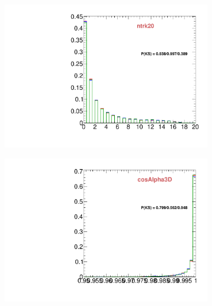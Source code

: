 \begin{figure}
        \centering
        \begin{subfigure}[b]{0.2\textwidth}
                \centering
                \includegraphics[width=\textwidth]{Figures/VariablesComparison/MC_barrel_figs_3h/ntrk20}
                \label{fig:MC_barrel_ntrk20_3h}
        \end{subfigure}
        \begin{subfigure}[b]{0.2\textwidth}
                \centering
                \includegraphics[width=\textwidth]{Figures/VariablesComparison/MC_barrel_figs_3h/cosAlpha3D}
                \label{fig:MC_barrel_cosAlpha3D_3h}
        \end{subfigure}
        \begin{subfigure}[b]{0.2\textwidth}
                \centering

\end{subfigure}
\end{figure}

